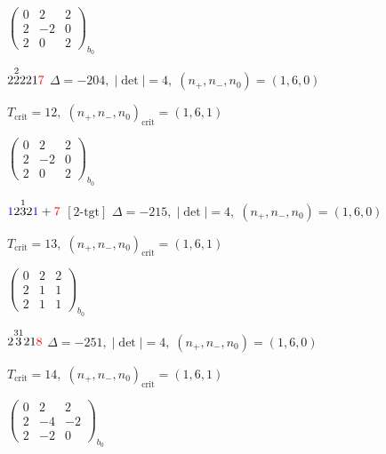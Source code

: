 \documentclass[10pt]{article}
\begin{document}
\hspace{2em}$\left(\begin{smallmatrix}0 & 2 & 2 \\ 2 & -2 & 0 \\ 2 & 0 & 2\end{smallmatrix}\right)_{\!b_0}$

\smallskip

$2\overset{2}{2}221\textcolor{red}{7}$ \quad $\Delta=-204,\; |\det|=4,\; (n_+,n_-,n_0)=(1,6,0)$

\hspace{1em}$T_{\text{crit}}=12,\; (n_+,n_-,n_0)_{\text{crit}}=(1,6,1)$

\hspace{2em}$\left(\begin{smallmatrix}0 & 2 & 2 \\ 2 & -2 & 0 \\ 2 & 0 & 2\end{smallmatrix}\right)_{\!b_0}$

\smallskip

$\textcolor{blue}{1}2\overset{1}{3}2\textcolor{blue}{1}+\textcolor{red}{7}$ $\scriptstyle [2\text{-tgt}]$ \quad $\Delta=-215,\; |\det|=4,\; (n_+,n_-,n_0)=(1,6,0)$

\hspace{1em}$T_{\text{crit}}=13,\; (n_+,n_-,n_0)_{\text{crit}}=(1,6,1)$

\hspace{2em}$\left(\begin{smallmatrix}0 & 2 & 2 \\ 2 & 1 & 1 \\ 2 & 1 & 1\end{smallmatrix}\right)_{\!b_0}$

\smallskip

$2\overset{31}{3}21\textcolor{red}{8}$ \quad $\Delta=-251,\; |\det|=4,\; (n_+,n_-,n_0)=(1,6,0)$

\hspace{1em}$T_{\text{crit}}=14,\; (n_+,n_-,n_0)_{\text{crit}}=(1,6,1)$

\hspace{2em}$\left(\begin{smallmatrix}0 & 2 & 2 \\ 2 & -4 & -2 \\ 2 & -2 & 0\end{smallmatrix}\right)_{\!b_0}$
\end{document}
